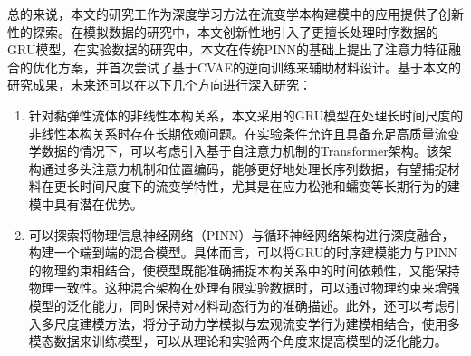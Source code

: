 总的来说，本文的研究工作为深度学习方法在流变学本构建模中的应用提供了创新性的探索。在模拟数据的研究中，本文创新性地引入了更擅长处理时序数据的GRU模型，在实验数据的研究中，本文在传统PINN的基础上提出了注意力特征融合的优化方案，并首次尝试了基于CVAE的逆向训练来辅助材料设计。基于本文的研究成果，未来还可以在以下几个方向进行深入研究：

\begin{enumerate}[topsep = 0 pt, itemsep= 0 pt, parsep=0pt, partopsep=0pt, leftmargin=44pt, itemindent=0pt, labelsep=6pt, label=(\arabic*)]
  \item 针对黏弹性流体的非线性本构关系，本文采用的GRU模型在处理长时间尺度的非线性本构关系时存在长期依赖问题。在实验条件允许且具备充足高质量流变学数据的情况下，可以考虑引入基于自注意力机制的Transformer架构。该架构通过多头注意力机制和位置编码，能够更好地处理长序列数据，有望捕捉材料在更长时间尺度下的流变学特性，尤其是在应力松弛和蠕变等长期行为的建模中具有潜在优势。

  \item 可以探索将物理信息神经网络（PINN）与循环神经网络架构进行深度融合，构建一个端到端的混合模型。具体而言，可以将GRU的时序建模能力与PINN的物理约束相结合，使模型既能准确捕捉本构关系中的时间依赖性，又能保持物理一致性。这种混合架构在处理有限实验数据时，可以通过物理约束来增强模型的泛化能力，同时保持对材料动态行为的准确描述。此外，还可以考虑引入多尺度建模方法，将分子动力学模拟与宏观流变学行为建模相结合，使用多模态数据来训练模型，可以从理论和实验两个角度来提高模型的泛化能力。
\end{enumerate}

